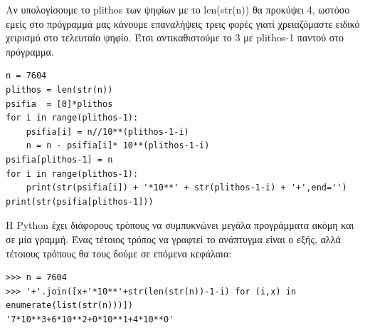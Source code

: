 Αν υπολογίσουμε το plithos των ψηφίων με το len(str(n)) θα προκύψει 4, ωστόσο εμείς στο πρόγραμμά μας κάνουμε επαναλήψεις τρεις φορές γιατί χρειαζόμαστε ειδικό χειρισμό στο τελευταίο ψηφίο. Έτσι αντικαθιστούμε το 3 με plithos-1 παντού στο πρόγραμμα.
\begin{lstlisting}
n = 7604
plithos = len(str(n))
psifia  = [0]*plithos
for i in range(plithos-1):
    psifia[i] = n//10**(plithos-1-i)
    n = n - psifia[i]* 10**(plithos-1-i)
psifia[plithos-1] = n
for i in range(plithos-1):
    print(str(psifia[i]) + '*10**' + str(plithos-1-i) + '+',end='')
print(str(psifia[plithos-1]))
\end{lstlisting}

Η Python έχει διάφορους τρόπους να συμπυκνώνει μεγάλα προγράμματα ακόμη και σε μία γραμμή. Ένας τέτοιος τρόπος να γραφτεί το ανάπτυγμα είναι ο εξής, αλλά τέτοιους τρόπους θα τους δούμε σε επόμενα κεφάλαια: 
\begin{lstlisting}
>>> n = 7604
>>> '+'.join([x+'*10**'+str(len(str(n))-1-i) for (i,x) in enumerate(list(str(n)))])
'7*10**3+6*10**2+0*10**1+4*10**0'
\end{lstlisting}